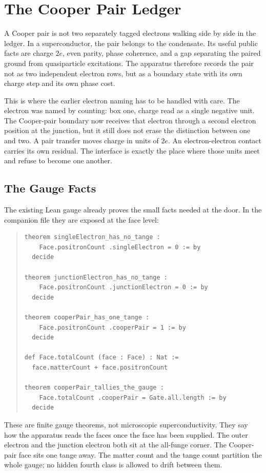 \chapter{The Cooper Pair Ledger}

A Cooper pair is not two separately tagged electrons walking side by side in the ledger. In a superconductor, the
pair belongs to the condensate. Its useful public facts are charge \(2e\), even parity, phase coherence, and a
gap separating the paired ground from quasiparticle excitations. The apparatus therefore records the pair not as
two independent electron rows, but as a boundary state with its own charge step and its own phase cost.

This is where the earlier electron naming has to be handled with care. The electron was named by counting: box
one, charge read as a single negative unit. The Cooper-pair boundary now receives that electron through a second
electron position at the junction, but it still does not erase the distinction between one and two. A pair
transfer moves charge in units of \(2e\). An electron-electron contact carries its own residual. The interface is
exactly the place where those units meet and refuse to become one another.

\section{The Gauge Facts}

The existing Lean gauge already proves the small facts needed at the door. In the companion file they are exposed
at the face level:

\begin{quote}\small
\begin{verbatim}
theorem singleElectron_has_no_tange :
    Face.positronCount .singleElectron = 0 := by
  decide

theorem junctionElectron_has_no_tange :
    Face.positronCount .junctionElectron = 0 := by
  decide

theorem cooperPair_has_one_tange :
    Face.positronCount .cooperPair = 1 := by
  decide

def Face.totalCount (face : Face) : Nat :=
  face.matterCount + face.positronCount

theorem cooperPair_tallies_the_gauge :
    Face.totalCount .cooperPair = Gate.all.length := by
  decide
\end{verbatim}
\end{quote}

These are finite gauge theorems, not microscopic superconductivity. They say how the apparatus reads the faces
once the face has been supplied. The outer electron and the junction electron both sit at the all-funge corner.
The Cooper-pair face sits one tange away. The matter count and the tange count partition the whole gauge; no
hidden fourth class is allowed to drift between them.

